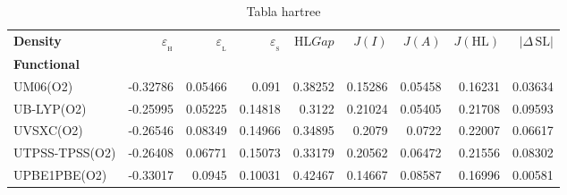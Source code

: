 \documentclass[preprint,landscape,12pt]{elsarticle}
\begin{document}
	\begin{table}
		\caption{ Tabla hartree}
		\centering
		\footnotesize
		\begin{tabular}{lrrrrrrrr}
			\hline
			\textbf{Density}    & $\varepsilon_{_{\mathrm{H}}}$	& $\varepsilon_{_{\mathrm{L}}}$  & $\varepsilon_{_{\mathrm{S}}}$& HL$Gap$ & $J(I)$ & $J(A)$ & $J(\mathrm{HL})$  & \textbf{$\left|\Delta\,\mathrm{SL}\right|$}  \\
			\textbf{Functional} &   &  &     &   &  &  &  &  \\
			\hline \hline 

UM06(O2) & -0.32786 & 0.05466 & 0.091 & 0.38252 & 0.15286 & 0.05458 & 0.16231 & 0.03634\\
UB-LYP(O2) & -0.25995 & 0.05225 & 0.14818 & 0.3122 & 0.21024 & 0.05405 & 0.21708 & 0.09593\\
UVSXC(O2) & -0.26546 & 0.08349 & 0.14966 & 0.34895 & 0.2079 & 0.0722 & 0.22007 & 0.06617\\
UTPSS-TPSS(O2) & -0.26408 & 0.06771 & 0.15073 & 0.33179 & 0.20562 & 0.06472 & 0.21556 & 0.08302\\
UPBE1PBE(O2) & -0.33017 & 0.0945 & 0.10031 & 0.42467 & 0.14667 & 0.08587 & 0.16996 & 0.00581\\

	 		\hline
		\end{tabular}
			\label{tab:hartree}
	\end{table}
\end{document}
